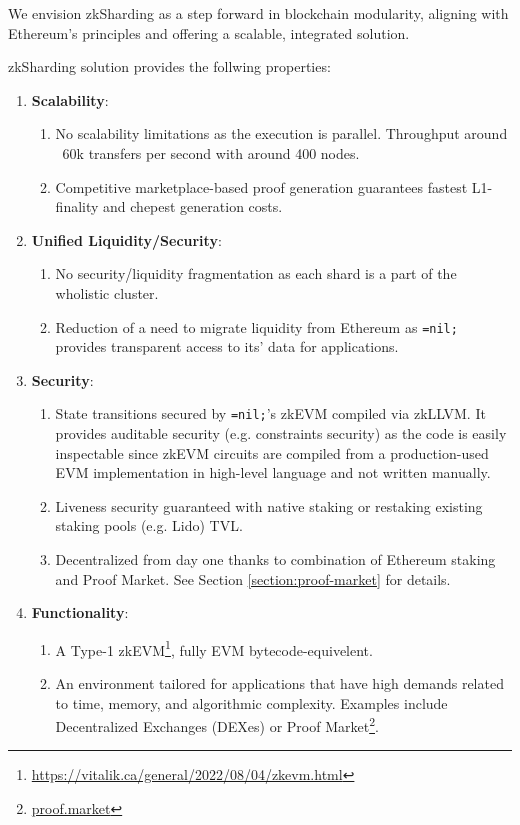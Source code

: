 We envision zkSharding as a step forward in blockchain modularity, aligning with 
Ethereum's principles and offering a scalable, integrated solution.

\nil zkSharding solution provides the follwing properties:
\begin{enumerate}
    \item \textbf{Scalability}: 
    \begin{enumerate}
        \item No scalability limitations as the execution is parallel. 
        Throughput around ~60k transfers per second with around 400
        nodes.
        \item Competitive marketplace-based proof generation guarantees
        fastest L1-finality and chepest generation costs.
    \end{enumerate}
    \item \textbf{Unified Liquidity/Security}:
    \begin{enumerate}
        \item No security/liquidity fragmentation as each shard is
         a part of the wholistic cluster. 
        \item Reduction of a need to migrate liquidity from Ethereum as
        \texttt{=nil;} provides transparent access to its' data for
        applications.
    \end{enumerate}
    \item \textbf{Security}:
    \begin{enumerate}
        \item State transitions secured by \texttt{=nil;}'s 
            zkEVM compiled via zkLLVM.
            It provides auditable security (e.g. constraints security) as the code is 
            easily inspectable since zkEVM circuits are compiled from a 
            production-used EVM implementation in high-level language
            and not written manually.
        \item Liveness security guaranteed with native staking or restaking existing staking pools (e.g. Lido) TVL.
        \item Decentralized from day one thanks to combination of Ethereum staking and Proof Market.
            See Section \ref{section:proof-market} for details.
    \end{enumerate}
    \item \textbf{Functionality}:
    \begin{enumerate}
        \item A Type-1 zkEVM\footnote{
            \url{https://vitalik.ca/general/2022/08/04/zkevm.html}
        }, fully EVM bytecode-equivelent.
        \item An environment tailored for applications 
            that have high demands related to time, memory, 
            and algorithmic complexity. 
            Examples include Decentralized Exchanges (DEXes) 
            or Proof Market\footnote{\url{proof.market}}.
    \end{enumerate}
\end{enumerate}

